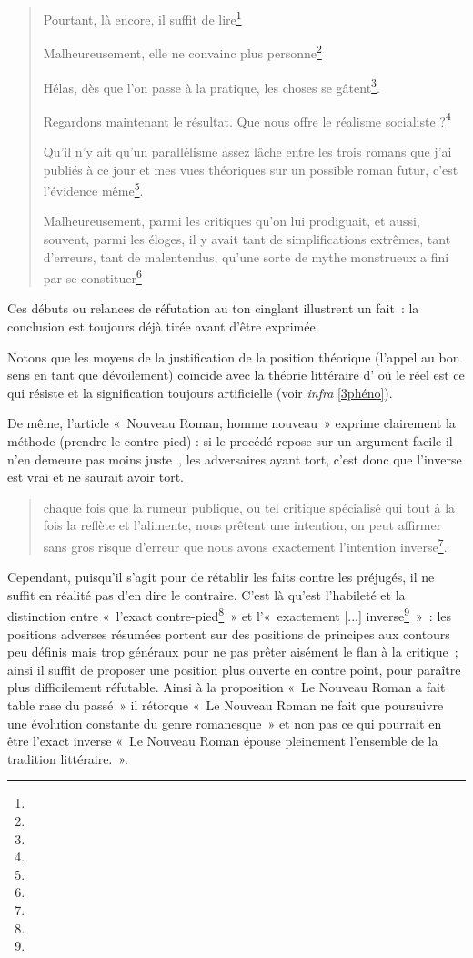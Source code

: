 \documentclass[12pt, a4paper]{article}
\begin{document}
\begin{quote}
    Pourtant, là encore, il suffit de lire\footnote{}


    Malheureusement, elle ne convainc plus personne\footnote{}


    Hélas, dès que l’on passe à la pratique, les choses se gâtent\footnote{}.

    Regardons maintenant le résultat. Que nous offre le réalisme socialiste ?\footnote{}

    Qu’il n’y ait qu’un parallélisme assez lâche entre les trois romans que j’ai publiés à ce jour et mes vues théoriques sur un possible roman futur, c’est l’évidence même\footnote{}.

    Malheureusement, parmi les critiques qu’on lui prodiguait, et aussi, souvent, parmi les éloges, il y avait tant de simplifications extrêmes, tant d’erreurs, tant de malentendus, qu’une sorte de mythe monstrueux a fini par se constituer\footnote{}
\end{quote}
Ces débuts ou relances de réfutation au ton cinglant illustrent un fait~: la conclusion est toujours déjà tirée avant d'être exprimée.

Notons que les moyens de la justification de la position théorique (l'appel au bon sens en tant que dévoilement) coïncide avec la théorie littéraire d'\robbe{} où le réel est ce qui résiste et la signification toujours artificielle (voir \textit{infra} \ref{3phéno}).

De même, l'article «~Nouveau Roman, homme nouveau~» exprime clairement la méthode (prendre le contre-pied) : si le procédé repose sur un argument facile il n'en demeure pas moins juste~, les adversaires ayant tort, c'est donc que l'inverse est vrai et \robbe{} ne saurait avoir tort. 
\begin{quote}
    chaque fois que la rumeur publique, ou tel critique spécialisé qui tout à la fois la reflète et l’alimente, nous prêtent une intention, on peut affirmer sans gros risque d’erreur que nous avons exactement l’intention inverse\footnote{}.
\end{quote}
Cependant, puisqu'il s'agit pour \robbe{} de rétablir les faits contre les préjugés, il ne suffit en réalité pas d'en dire le contraire. C'est là qu'est l'habileté et la distinction entre «~l'exact contre-pied\footnote{}~» et l'«~exactement [...] inverse\footnote{}~»~: les positions adverses résumées portent sur des positions de principes aux contours peu définis mais trop généraux pour ne pas prêter aisément le flan à la critique~; ainsi il suffit de proposer une position plus ouverte en contre point, pour paraître plus difficilement réfutable. Ainsi à la proposition «~Le Nouveau Roman a fait table rase du passé~» il rétorque «~Le Nouveau Roman ne fait que poursuivre une évolution constante du genre romanesque~» et non pas ce qui pourrait en être l'exact inverse «~Le Nouveau Roman épouse pleinement l'ensemble de la tradition littéraire.~».
\end{document}
